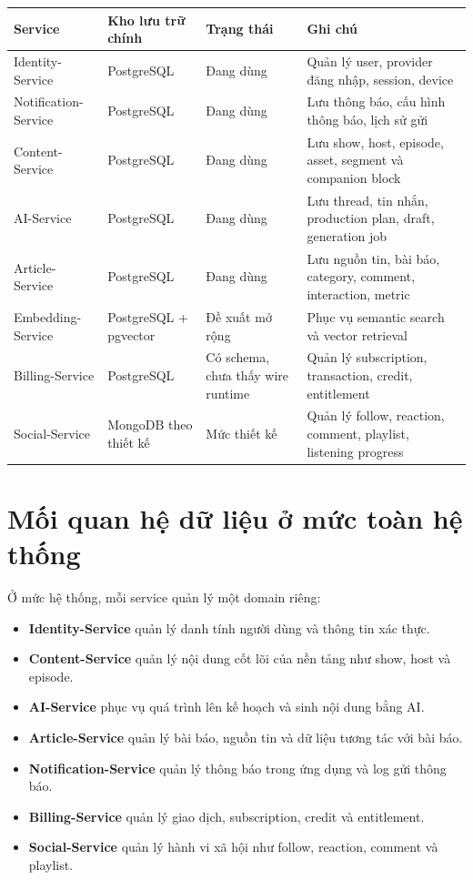 \documentclass[12pt,a4paper]{report}
\begin{document}
\begin{longtable}{|p{3.8cm}|p{3.3cm}|p{3.1cm}|p{4.6cm}|}
\hline
\textbf{Service} & \textbf{Kho lưu trữ chính} & \textbf{Trạng thái} & \textbf{Ghi chú} \\
\hline
Identity-Service & PostgreSQL & Đang dùng & Quản lý user, provider đăng nhập, session, device \\
\hline
Notification-Service & PostgreSQL & Đang dùng & Lưu thông báo, cấu hình thông báo, lịch sử gửi \\
\hline
Content-Service & PostgreSQL & Đang dùng & Lưu show, host, episode, asset, segment và companion block \\
\hline
AI-Service & PostgreSQL & Đang dùng & Lưu thread, tin nhắn, production plan, draft, generation job \\
\hline
Article-Service & PostgreSQL & Đang dùng & Lưu nguồn tin, bài báo, category, comment, interaction, metric \\
\hline
Embedding-Service & PostgreSQL + pgvector & Đề xuất mở rộng & Phục vụ semantic search và vector retrieval \\
\hline
Billing-Service & PostgreSQL & Có schema, chưa thấy wire runtime & Quản lý subscription, transaction, credit, entitlement \\
\hline
Social-Service & MongoDB theo thiết kế & Mức thiết kế & Quản lý follow, reaction, comment, playlist, listening progress \\
\hline
\end{longtable}

\section{Mối quan hệ dữ liệu ở mức toàn hệ thống}

Ở mức hệ thống, mỗi service quản lý một domain riêng:

\begin{itemize}
    \item \textbf{Identity-Service} quản lý danh tính người dùng và thông tin xác thực.
    \item \textbf{Content-Service} quản lý nội dung cốt lõi của nền tảng như show, host và episode.
    \item \textbf{AI-Service} phục vụ quá trình lên kế hoạch và sinh nội dung bằng AI.
    \item \textbf{Article-Service} quản lý bài báo, nguồn tin và dữ liệu tương tác với bài báo.
    \item \textbf{Notification-Service} quản lý thông báo trong ứng dụng và log gửi thông báo.
    \item \textbf{Billing-Service} quản lý giao dịch, subscription, credit và entitlement.
    \item \textbf{Social-Service} quản lý hành vi xã hội như follow, reaction, comment và playlist.
\end{itemize}
\end{document}
